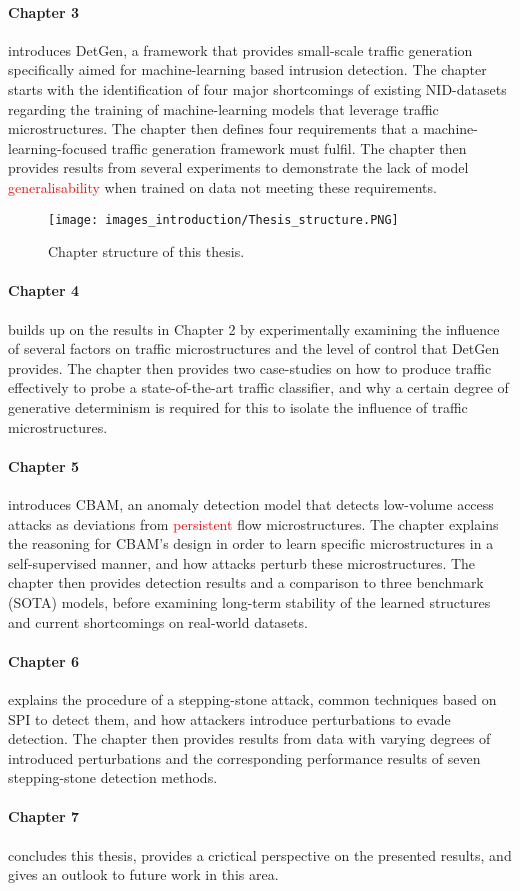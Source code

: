 \paragraph*{Chapter 3} introduces DetGen, a framework that provides small-scale traffic generation specifically aimed for machine-learning based intrusion detection. The chapter starts with the identification of four major shortcomings of existing NID-datasets regarding the training of machine-learning models that leverage traffic microstructures. The chapter then defines four requirements that a machine-learning-focused traffic generation framework must fulfil. The chapter then provides results from several experiments to demonstrate the lack of model \textcolor{red}{generalisability} when trained on data not meeting these requirements. 

\begin{figure}[t]
\centering
\texttt{[image: images\_introduction/Thesis\_structure.PNG]}
\caption{Chapter structure of this thesis.}\label{Fig:structure}
\end{figure}

\paragraph*{Chapter 4} builds up on the results in Chapter 2 by experimentally examining the influence of several factors on traffic microstructures and the level of control that DetGen provides. The chapter then provides two case-studies on how to produce traffic effectively to probe a state-of-the-art traffic classifier, and why a certain degree of generative determinism is required for this to isolate the influence of traffic microstructures. 

\paragraph*{Chapter 5} introduces CBAM, an anomaly detection model that detects low-volume access attacks as deviations from \textcolor{red}{persistent} flow microstructures. The chapter explains the reasoning for CBAM's design in order to learn specific microstructures in a self-supervised manner, and how attacks perturb these microstructures. The chapter then provides detection results and a comparison to three benchmark (SOTA) models, before examining long-term stability of the learned structures and current shortcomings on real-world datasets.

\paragraph*{Chapter 6} explains the procedure of a stepping-stone attack, common techniques based on SPI to detect them, and how attackers introduce perturbations to evade detection. The chapter then provides  results from data with varying degrees of introduced perturbations and the corresponding performance results of seven stepping-stone detection methods.

\paragraph*{Chapter 7} concludes this thesis, provides a crictical perspective on the presented results, and gives an outlook to future work in this area.